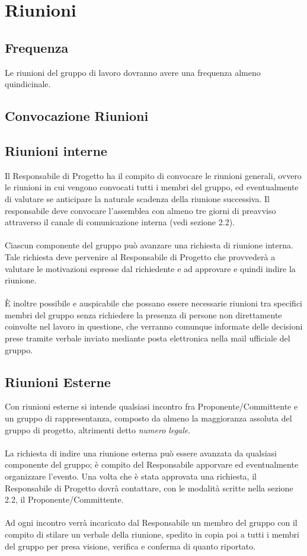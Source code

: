 \section{Riunioni}
\subsection{Frequenza}
Le riunioni del gruppo di lavoro dovranno avere una frequenza almeno quindicinale.
\subsection{Convocazione Riunioni}
\subsection{Riunioni interne}
Il Responsabile di Progetto ha il compito di convocare le riunioni generali, ovvero le riunioni in cui vengono convocati tutti i membri del gruppo, ed eventualmente di valutare se anticipare la naturale scadenza della riunione successiva. Il responsabile deve convocare l’assemblea con almeno tre giorni di preavviso attraverso il canale di comunicazione interna (vedi sezione 2.2). \\ \\
Ciascun componente del gruppo può avanzare una richiesta di riunione interna.
Tale richiesta deve pervenire al Responsabile di Progetto che provvederà a valutare le motivazioni espresse dal richiedente e ad approvare e quindi indire la riunione. \\ \\
È inoltre possibile e auspicabile che possano essere necessarie riunioni tra specifici membri del gruppo senza richiedere la presenza di persone non direttamente coinvolte nel lavoro in questione, che verranno comunque informate delle decisioni
prese tramite verbale inviato mediante posta elettronica nella mail ufficiale del gruppo.

\subsection{Riunioni Esterne}
Con riunioni esterne si intende qualsiasi incontro fra Proponente/Committente
e un gruppo di rappresentanza, composto da almeno la maggioranza assoluta del
gruppo di progetto, altrimenti detto \textit{numero legale}.\\
\\
La richiesta di indire una riunione esterna può essere avanzata da qualsiasi componente del gruppo; è compito del Responsabile apporvare ed eventualmente organizzare l'evento. Una volta che è stata approvata una richiesta, il Responsabile di Progetto dovrà contattare, con le modalità scritte nella sezione 2.2, il Proponente/Committente.
\\\\
Ad ogni incontro verrà incaricato dal Responsabile un membro del gruppo con il compito di stilare un verbale della riunione, spedito in copia poi a tutti i membri del gruppo per presa visione, verifica e conferma di quanto riportato.